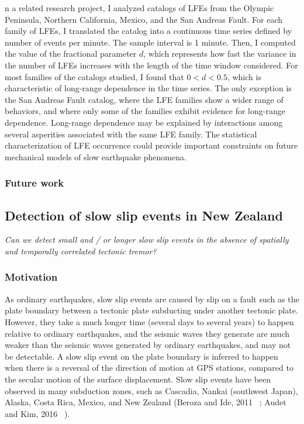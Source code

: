 \documentclass[letterpaper, 12pt]{article}
\begin{document}
n a related research project, I analyzed catalogs of LFEs from the Olympic Peninsula, Northern California, Mexico, and the San Andreas Fault. For each family of LFEs, I translated the catalog into a continuous time series defined by number of events per minute. The sample interval is 1 minute. Then, I computed the value of the fractional parameter $d$, which represents how fast the variance in the number of LFEs increases with the length of the time window considered. For most families of the catalogs studied, I found that $0 < d < 0.5$, which is characteristic of long-range dependence in the time series. The only exception is the San Andreas Fault catalog, where the LFE families show a wider range of behaviors, and where only some of the families exhibit evidence for long-range dependence. Long-range dependence may be explained by interactions among several asperities associated with the same LFE family. The statistical characterization of LFE occurrence could provide important constraints on future mechanical models of slow earthquake phenomena.

\subsubsection*{Future work}

\subsection{Detection of slow slip events in New Zealand}

\textit{Can we detect small and / or longer slow slip events in the absence of spatially and temporally correlated tectonic tremor?}

\subsubsection*{Motivation}

As ordinary earthquakes, slow slip events are caused by slip on a fault such as the plate boundary between a tectonic plate subducting under another tectonic plate. However, they take a much longer time (several days to several years) to happen relative to ordinary earthquakes, and the seismic waves they generate are much weaker than the seismic waves generated by ordinary earthquakes, and may not be detectable.  A slow slip event on the plate boundary is inferred to happen when there is a reversal of the direction of motion at GPS stations, compared to the secular motion of the surface displacement. Slow slip events have been observed in many subduction zones, such as Cascadia, Nankai (southwest Japan), Alaska, Costa Rica, Mexico, and New Zealand (Beroza and Ide, 2011 ~\cite{BER_2011}; Audet and Kim, 2016 ~\cite{AUD_2016}). \\
\end{document}
